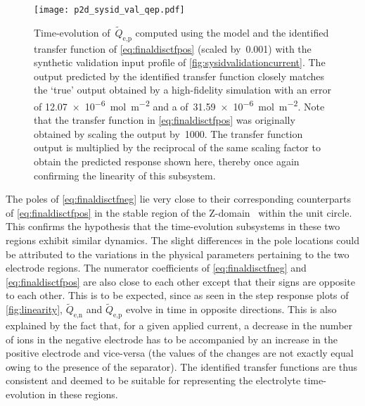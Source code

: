 \begin{figure}[!htbp]
    \centering
    \texttt{[image: p2d\_sysid\_val\_qep.pdf]}
    \caption[$\widetilde{Q}_{\text{e,p}}(t)$ outputs from  and
    identified transfer function for training profile]{%
        Time-evolution of~$\widetilde{Q}_{\text{e,p}}$ computed using the
         model  and the identified transfer function
        of \cref{eq:finaldisctfpos} (scaled by~0.001) with the synthetic
        validation input profile of \cref{fig:sysidvalidationcurrent}. The output
        predicted by the identified transfer function closely matches the `true'
        output obtained by a high-fidelity  simulation with an
         error of \SI{12.07e-6}{\mole\per\meter\squared} and a
         of~\SI{31.59e-6}{\mole\per\meter\squared}. Note that the
        transfer function in \cref{eq:finaldisctfpos} was originally obtained by
        scaling the output by~1000. The transfer function output is
        multiplied by the reciprocal of the same scaling factor to obtain the
        predicted response shown here, thereby once again confirming the
        linearity of this subsystem.
    }%
    \label{fig:tfpredQepval}
\end{figure}

The  poles of \cref{eq:finaldisctfneg}  lie  very close  to their  corresponding
counterparts of \cref{eq:finaldisctfpos}  in the  stable region of  the Z-domain
\ie~within   the  unit  circle.   This  confirms  the  hypothesis   that  the
time-evolution subsystems  in these  two regions  exhibit similar  dynamics. The
slight differences in  the pole locations could be attributed  to the variations
in  the  physical  parameters  pertaining  to the  two  electrode  regions.  The
numerator coefficients  of \cref{eq:finaldisctfneg} and \cref{eq:finaldisctfpos}
are  also  close  to  each  other  except  that  their  signs  are  opposite  to
each   other.  This   is  to   be   expected,  since   as  seen   in  the   step
response   plots   of \cref{fig:linearity},   $\widetilde{Q}_{\text{e,n}}$   and
$\widetilde{Q}_{\text{e,p}}$ evolve in time in opposite directions. This is also
explained by  the fact  that, for  a given  applied current,  a decrease  in the
number of ions in the negative electrode has to be accompanied by an increase in
the positive electrode and vice-versa (the values of the changes are not exactly
equal owing to the presence of the separator). The identified transfer functions
are thus consistent  and deemed to be suitable for  representing the electrolyte
time-evolution in these regions.

